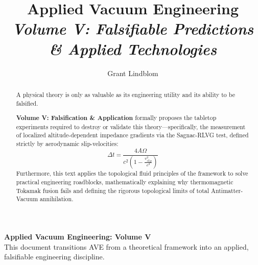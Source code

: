 \title{\textbf{Applied Vacuum Engineering} \\ \large \textit{Volume V: Falsifiable Predictions \& Applied Technologies}}
\author{Grant Lindblom}
\date{}

\maketitle

\vfill
\noindent\textbf{Applied Vacuum Engineering: Volume V} \\
This document transitions AVE from a theoretical framework into an applied, falsifiable engineering discipline.

\begin{abstract}
    A physical theory is only as valuable as its engineering utility and its ability to be falsified.
    
    \textbf{Volume V: Falsification \& Application} formally proposes the tabletop experiments required to destroy or validate this theory—specifically, the measurement of localized altitude-dependent impedance gradients via the Sagnac-RLVG test, defined strictly by aerodynamic slip-velocities:
    \begin{equation}
        \Delta t = \frac{4 A \Omega}{c^2 (1 - \frac{v_{slip}^2}{c^2})}
    \end{equation}
    Furthermore, this text applies the topological fluid principles of the framework to solve practical engineering roadblocks, mathematically explaining why thermomagnetic Tokamak fusion fails and defining the rigorous topological limits of total Antimatter-Vacuum annihilation.
\end{abstract}
